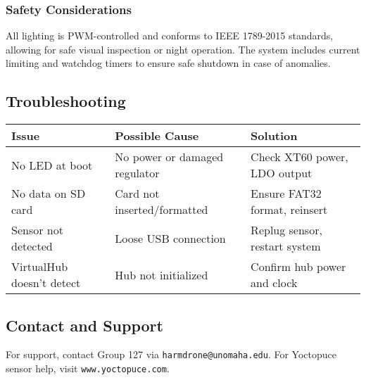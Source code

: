 \documentclass[../main.tex]{subfiles}
\begin{document}
\subsubsection{Safety Considerations}
All lighting is PWM-controlled and conforms to IEEE 1789-2015 standards, allowing for safe visual inspection or night operation. The system includes current limiting and watchdog timers to ensure safe shutdown in case of anomalies.

\subsection{Troubleshooting}
\begin{tabular}{|l|l|l|}
\hline
\textbf{Issue} & \textbf{Possible Cause} & \textbf{Solution} \\
\hline
No LED at boot & No power or damaged regulator & Check XT60 power, LDO output \\
\hline
No data on SD card & Card not inserted/formatted & Ensure FAT32 format, reinsert \\
\hline
Sensor not detected & Loose USB connection & Replug sensor, restart system \\
\hline
VirtualHub doesn't detect & Hub not initialized & Confirm hub power and clock \\
\hline
\end{tabular}

\subsection{Contact and Support}
For support, contact Group 127 via \texttt{harmdrone@unomaha.edu}. For Yoctopuce sensor help, visit \texttt{www.yoctopuce.com}.
\end{document}
